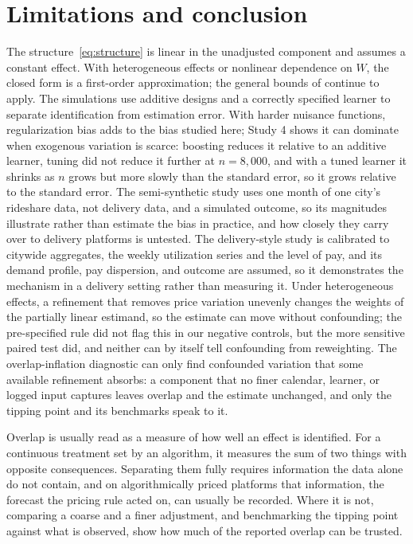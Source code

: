 \documentclass[11pt]{article}
\theoremstyle{remark}
\begin{document}
\section{Limitations and conclusion}
\label{sec:limits}

The structure~\eqref{eq:structure} is linear in the unadjusted component and assumes a constant effect. With heterogeneous effects or nonlinear dependence on $W$, the closed form is a first-order approximation; the general bounds of \citet{chernozhukov2022} continue to apply. The simulations use additive designs and a correctly specified learner to separate identification from estimation error. With harder nuisance functions, regularization bias adds to the bias studied here; Study 4 shows it can dominate when exogenous variation is scarce: boosting reduces it relative to an additive learner, tuning did not reduce it further at $n = 8{,}000$, and with a tuned learner it shrinks as $n$ grows but more slowly than the standard error, so it grows relative to the standard error. The semi-synthetic study uses one month of one city's rideshare data, not delivery data, and a simulated outcome, so its magnitudes illustrate rather than estimate the bias in practice, and how closely they carry over to delivery platforms is untested. The delivery-style study is calibrated to citywide aggregates, the weekly utilization series and the level of pay, and its demand profile, pay dispersion, and outcome are assumed, so it demonstrates the mechanism in a delivery setting rather than measuring it. Under heterogeneous effects, a refinement that removes price variation unevenly changes the weights of the partially linear estimand, so the estimate can move without confounding; the pre-specified rule did not flag this in our negative controls, but the more sensitive paired test did, and neither can by itself tell confounding from reweighting. The overlap-inflation diagnostic can only find confounded variation that some available refinement absorbs: a component that no finer calendar, learner, or logged input captures leaves overlap and the estimate unchanged, and only the tipping point and its benchmarks speak to it.

Overlap is usually read as a measure of how well an effect is identified. For a continuous treatment set by an algorithm, it measures the sum of two things with opposite consequences. Separating them fully requires information the data alone do not contain, and on algorithmically priced platforms that information, the forecast the pricing rule acted on, can usually be recorded. Where it is not, comparing a coarse and a finer adjustment, and benchmarking the tipping point against what is observed, show how much of the reported overlap can be trusted.
\end{document}
